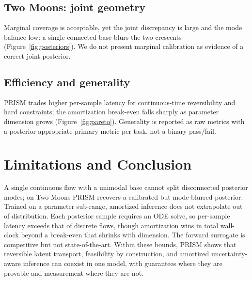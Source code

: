 \documentclass{article}
\begin{document}
\subsection{Two Moons: joint geometry}

Marginal coverage is acceptable, yet the joint discrepancy is large and the mode
balance low: a single connected base blurs the two crescents
(Figure~\ref{fig:posteriors}). We do not present marginal calibration as evidence
of a correct joint posterior.

\subsection{Efficiency and generality}


PRISM trades higher per-sample latency for continuous-time reversibility and hard
constraints; the amortization break-even falls sharply as parameter dimension grows
(Figure~\ref{fig:pareto}). Generality is reported as raw metrics with a
posterior-appropriate primary metric per task, not a binary pass/fail.

\section{Limitations and Conclusion}
\label{sec:limitations}
A single continuous flow with a unimodal base cannot split disconnected posterior
modes; on Two Moons PRISM recovers a calibrated but mode-blurred posterior. Trained
on a parameter sub-range, amortized inference does not extrapolate out of
distribution. Each posterior sample requires an ODE solve, so per-sample latency
exceeds that of discrete flows, though amortization wins in total wall-clock beyond
a break-even that shrinks with dimension. The forward surrogate is competitive but
not state-of-the-art. Within these bounds, PRISM shows that reversible latent
transport, feasibility by construction, and amortized uncertainty-aware inference
can coexist in one model, with guarantees where they are provable and measurement
where they are not.






\appendix
\end{document}
